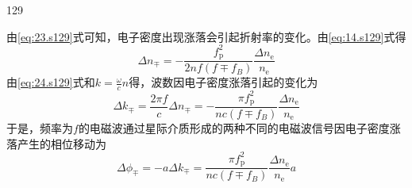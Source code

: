 \begin{solution}{129}
\begin{subsolution}
    \end{subsolution}
    \begin{subsolution}
        由\eqref{eq:23.s129}式可知，电子密度出现涨落会引起折射率的变化。由\eqref{eq:14.s129}式得
        \begin{equation}
            \Delta n _ {\mp} = - \frac {f _ {\mathrm{p}} ^ {2}}{2 n f (f \mp f _ {B})} \frac {\Delta n _ {\mathrm{e}}}{n _ {\mathrm{e}}}
            \label{eq:24.s129}
        \end{equation}
        由\eqref{eq:24.s129}式和$k = \frac { \omega } { c } n$得，波数因电子密度涨落引起的变化为
        \begin{equation}
            \Delta k _ {\mp} = \frac {2 \pi f}{c} \Delta n _ {\mp} = - \frac {\pi f _ {\mathrm{p}} ^ {2}}{n c (f \mp f _ {B})} \frac {\Delta n _ {\mathrm{e}}}{n _ {\mathrm{e}}}
            \label{eq:25.s129}
        \end{equation}
        于是，频率为$f$的电磁波通过星际介质形成的两种不同的电磁波信号因电子密度涨落产生的相位移动为
        \begin{equation}
            \Delta \phi_ {\mp} = - a \Delta k _ {\mp} = \frac {\pi f _ {\mathrm{p}} ^ {2}}{n c (f \mp f _ {B})} \frac {\Delta n _ {\mathrm{e}}}{n _ {\mathrm{e}}} a
            \label{eq:26.s129}
        \end{equation}
    \end{subsolution}
\end{solution}